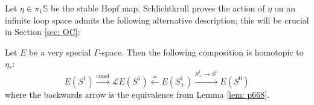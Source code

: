\documentclass{TPmod}
\def\bS{\mathbb{S}}
\newcommand{\cL}{\mathcal{L}}
\numberwithin{equation}{section}
\begin{document}
    Let $\eta \in \pi_1\bS$ be the stable Hopf map. Schlichtkrull proves the action of $\eta$ on an infinite loop space admits the following alternative description; this will be crucial in Section \ref{sec: OC}:
    \begin{prop}\label{prop: 331}
        Let $E$ be a very special $\Gamma$-space. Then the following composition is homotopic to $\eta_*$:
        \begin{equation}
            E(S^1) \xrightarrow{\operatorname{const}} \cL E(S^1) \xleftarrow{\simeq} E(S^1_+) \xrightarrow{S^1_+ \to S^0} E(S^0)
        \end{equation}
        where the backwards arrow is the equivalence from Lemma \ref{lem: p668}.
    \end{prop}
\end{document}
